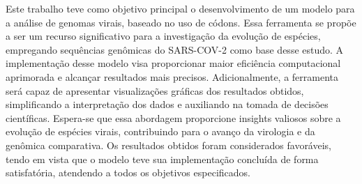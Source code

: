 Este trabalho teve como objetivo principal o desenvolvimento de um modelo para a análise de genomas virais, baseado no uso de códons. Essa ferramenta se propõe a ser um recurso significativo para a investigação da evolução de espécies, empregando sequências genômicas do SARS-COV-2 como base desse estudo. A implementação desse modelo visa proporcionar maior eficiência computacional aprimorada e alcançar resultados mais precisos. Adicionalmente, a ferramenta será capaz de apresentar visualizações gráficas dos resultados obtidos, simplificando a interpretação dos dados e auxiliando na tomada de decisões científicas. Espera-se que essa abordagem proporcione insights valiosos sobre a evolução de espécies virais, contribuindo para o avanço da virologia e da genômica comparativa. Os resultados obtidos foram considerados favoráveis, tendo em vista que o modelo teve sua implementação concluída de forma satisfatória, atendendo a todos os objetivos especificados.

